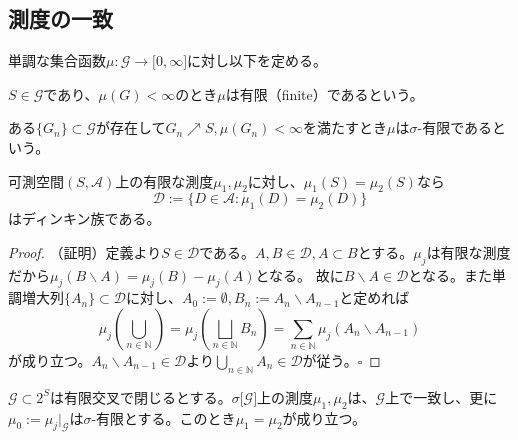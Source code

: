 \documentclass[../root.tex]{subfiles}
\begin{document}
\subsection{測度の一致}
\begin{Def}{}{}
単調な集合函数$ \mu\colon\mathscr{G}\rightarrow\lbrack 0, \infty \rbrack $に対し以下を定める。
\begin{EnumCond}
\item $ S\in\mathscr{G} $であり、$ \mu( G )\lt\infty $のとき$ \mu $は有限（finite）であるという。
\item ある$ \lbrace G_{n} \rbrace\subset\mathscr{G} $が存在して$ G_{n}\nearrow S, \mu( G_{n} )\lt\infty $を満たすとき$ \mu $は$ \sigma $-有限であるという。
\end{EnumCond}
\end{Def}

\begin{Prop}{}{}
可測空間$ ( S, \mathscr{A} ) $上の有限な測度$ \mu_{1}, \mu_{2} $に対し、$ \mu_{1}( S )=\mu_{2}( S ) $なら
\[ \mathscr{D}:=\lbrace D\in\mathscr{A} : \mu_{1}( D )=\mu_{2}( D ) \rbrace \]
はディンキン族である。
\end{Prop}

\begin{proof}
（証明）定義より$ S\in\mathscr{D} $である。$ A, B\in\mathscr{D}, A\subset B $とする。$ \mu_{j} $は有限な測度だから$ \mu_{j}( B\backslash A )=\mu_{j}( B )-\mu_{j}( A ) $となる。
故に$ B\backslash A\in\mathscr{D} $となる。また単調増大列$ \lbrace A_{n} \rbrace\subset\mathscr{D} $に対し、$ A_{0}:=\emptyset, B_{n}:=A_{n}\backslash A_{n-1} $と定めれば
\[ \mu_{j}\left( \bigcup_{n\in\mathbb{N}} \right)=\mu_{j}\left( \bigsqcup_{n\in\mathbb{N}}B_{n} \right)=\sum_{n\in\mathbb{N}}\mu_{j}( A_{n}\backslash A_{n-1} ) \]
が成り立つ。$ A_{n}\backslash A_{n-1}\in\mathscr{D} $より$ \bigcup_{n\in\mathbb{N}}A_{n}\in\mathscr{D} $が従う。$ \square $
\end{proof}

\begin{Thm}{}{}
$ \mathscr{G}\subset 2^{S} $は有限交叉で閉じるとする。$ \sigma\lbrack \mathscr{G} \rbrack $上の測度$ \mu_{1}, \mu_{2} $は、$ \mathscr{G} $上で一致し、更に
$ \mu_{0}:=\mu_{j}|_{\mathscr{G}} $は$ \sigma $-有限とする。このとき$ \mu_{1}=\mu_{2} $が成り立つ。
\end{Thm}
\end{document}
